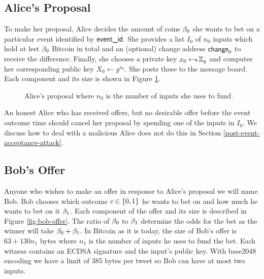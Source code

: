 \documentclass[runningheads]{llncs}
\begin{document}
\subsection{Alice's Proposal}

To make her proposal, Alice decides the amount of coins $\beta_0$ she wants to bet on a particular event identified by $\textsf{event\_id}$. She provides a list $I_0$ of $n_0$ inputs which hold at lest $\beta_0$ Bitcoin in total and an (optional) change address $\textsf{change}_0$ to receive the difference. Finally, she chooses a private key $x_0 \hskip2.3pt{\gets\!\!\mbox{\tiny${\$}$\normalsize}}\, \mathbb{Z}_q$ and computes her corresponding public key $X_0 \gets g^{x_0}$. She posts these to the message board. Each component and its size is shown in Figure \ref{fig:alice-proposal}.

\begin{figure}[h!]
  \centering
  \caption{Alice's proposal where $n_0$ is the number of inputs she uses to fund.}\label{fig:alice-proposal}
\end{figure}

An honest Alice who has received offers, but no desirable offer before the event outcome time should cancel her proposal by spending one of the inputs in $I_0$. We discuss how to deal with a malicious Alice does not do this in Section
\ref{post-event-acceptance-attack}.



\subsection{Bob's Offer}

Anyone who wishes to make an offer in response to Alice's proposal we will name Bob. Bob chooses which outcome $c \in \{0,1\}$ he wants to bet on and how much he wants to bet on it $\beta_1$. Each component of the offer and its size is described in Figure \ref{fig:bob-offer}. The ratio of $\beta_0$ to $\beta_1$ determine the odds for the bet as the winner will take $\beta_0 + \beta_1$. In Bitcoin as it is today, the size of Bob's offer is $63 + 130n_1$ bytes where $n_1$ is the number of inputs he uses to fund the bet. Each witness contains an ECDSA signature and the input's public key. With base2048 encoding\cite{base2048} we have a limit of 385 bytes per tweet so Bob can have at most two inputs.
\end{document}
